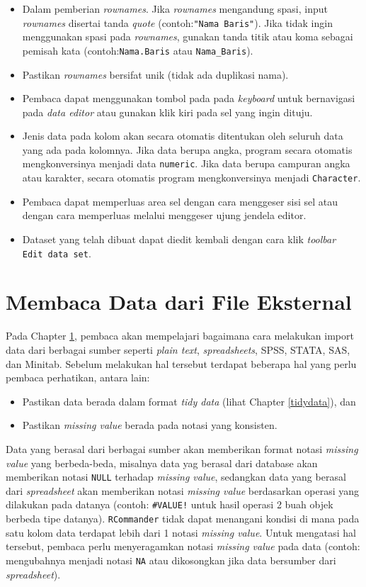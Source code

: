 \documentclass[12pt,]{krantz}
\providecommand{\tightlist}{%
  \setlength{\itemsep}{0pt}\setlength{\parskip}{0pt}}
\begin{document}
\begin{itemize}
\tightlist
\item
  Dalam pemberian \emph{rownames}. Jika \emph{rownames} mengandung spasi, input \emph{rownames} disertai tanda \emph{quote} (contoh:\texttt{"Nama\ Baris"}). Jika tidak ingin menggunakan spasi pada \emph{rownames}, gunakan tanda titik atau koma sebagai pemisah kata (contoh:\texttt{Nama.Baris} atau \texttt{Nama\_Baris}).
\item
  Pastikan \emph{rownames} bersifat unik (tidak ada duplikasi nama).
\item
  Pembaca dapat menggunakan tombol pada pada \emph{keyboard} untuk bernavigasi pada \emph{data editor} atau gunakan klik kiri pada sel yang ingin dituju.
\item
  Jenis data pada kolom akan secara otomatis ditentukan oleh seluruh data yang ada pada kolomnya. Jika data berupa angka, program secara otomatis mengkonversinya menjadi data \texttt{numeric}. Jika data berupa campuran angka atau karakter, secara otomatis program mengkonversinya menjadi \texttt{Character}.
\item
  Pembaca dapat memperluas area sel dengan cara menggeser sisi sel atau dengan cara memperluas melalui menggeser ujung jendela editor.
\item
  Dataset yang telah dibuat dapat diedit kembali dengan cara klik \emph{toolbar} \texttt{Edit\ data\ set}.
\end{itemize}

\hypertarget{impeks}{%
\section{Membaca Data dari File Eksternal}\label{impeks}}

Pada Chapter \ref{impeks}, pembaca akan mempelajari bagaimana cara melakukan import data dari berbagai sumber seperti \emph{plain text}, \emph{spreadsheets}, SPSS, STATA, SAS, dan Minitab. Sebelum melakukan hal tersebut terdapat beberapa hal yang perlu pembaca perhatikan, antara lain:

\begin{itemize}
\tightlist
\item
  Pastikan data berada dalam format \emph{tidy data} (lihat Chapter \ref{tidydata}), dan
\item
  Pastikan \emph{missing value} berada pada notasi yang konsisten.
\end{itemize}

Data yang berasal dari berbagai sumber akan memberikan format notasi \emph{missing value} yang berbeda-beda, misalnya data yag berasal dari database akan memberikan notasi \texttt{NULL} terhadap \emph{missing value}, sedangkan data yang berasal dari \emph{spreadsheet} akan memberikan notasi \emph{missing value} berdasarkan operasi yang dilakukan pada datanya (contoh: \texttt{\#VALUE!} untuk hasil operasi 2 buah objek berbeda tipe datanya). \texttt{RCommander} tidak dapat menangani kondisi di mana pada satu kolom data terdapat lebih dari 1 notasi \emph{missing value}. Untuk mengatasi hal tersebut, pembaca perlu menyeragamkan notasi \emph{missing value} pada data (contoh: mengubahnya menjadi notasi \texttt{NA} atau dikosongkan jika data bersumber dari \emph{spreadsheet}).
\end{document}

